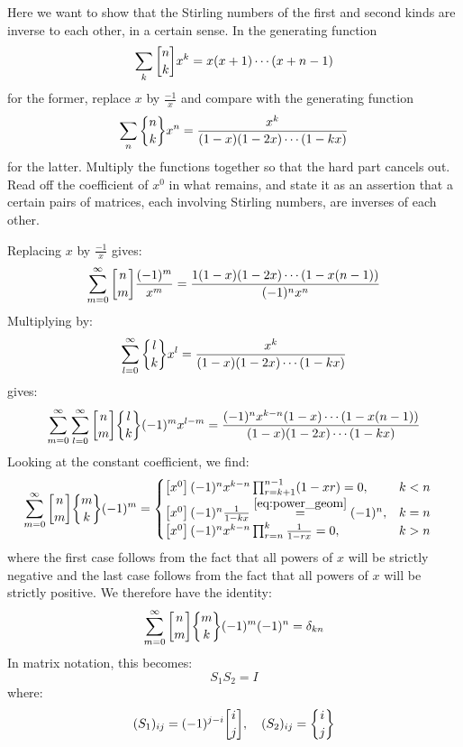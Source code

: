 \begin{exercise}
    Here we want to show that the Stirling numbers of the first and second kinds are inverse to each other, in a certain sense. In the generating function
    \[
        \sum_k \stirlingFst{n}{k}x^k = x(x+1)\cdots (x+n-1)
    \]
    for the former, replace $x$ by $\frac{-1}{x}$ and compare with the generating function 
    \[
        \sum_n \stirlingSnd{n}{k}x^n = \frac{x^k}{(1-x)(1-2x)\cdots (1-kx)}
    \]
    for the latter. Multiply the functions together so that the hard part cancels out. Read off the coefficient of $x^0$ in what remains, and state it as an assertion that a certain pairs of matrices, each involving Stirling numbers, are inverses of each other.
\end{exercise}
\begin{solution}
    Replacing $x$ by $\frac{-1}{x}$ gives:
    \[
        \bsum[m] \stirlingFst{n}{m}\frac{(-1)^m}{x^m} = \frac{1(1-x)(1-2x)\cdots (1-x(n-1))}{(-1)^nx^n}
    \]
    Multiplying by:
    \[
        \bsum[l] \stirlingSnd{l}{k}x^l = \frac{x^k}{(1-x)(1-2x)\cdots(1-kx)}
    \]
    gives:
    \[
        \bsum[m] \bsum[l] \stirlingFst{n}{m} \stirlingSnd{l}{k} (-1)^m x^{l-m} = \frac{(-1)^n x^{k-n}(1-x)\cdots(1-x(n-1))}{(1-x)(1-2x)\cdots(1-kx)}
    \]
    Looking at the constant coefficient, we find:
    \begin{align*}
        \bsum[m] \stirlingFst{n}{m}\stirlingSnd{m}{k}(-1)^m &= \begin{cases}
            \coeff{x^0} (-1)^n x^{k-n} \prod_{r=k+1}^{n-1} (1-xr) = 0, & k < n \\
            \coeff{x^0} (-1)^n \frac{1}{1-kx} \estep{\eqref{eq:power_geom}} (-1)^n, & k = n \\
            \coeff{x^0} (-1)^n x^{k-n} \prod_{r=n}^k \frac{1}{1-rx} = 0, & k > n
        \end{cases}
    \end{align*}
    where the first case follows from the fact that all powers of $x$ will be strictly negative and the last case follows from the fact that all powers of $x$ will be strictly positive. We therefore have the identity:
    \[
        \bsum[m] \stirlingFst{n}{m}\stirlingSnd{m}{k}(-1)^{m}(-1)^n = \delta_{kn}
    \]
    In matrix notation, this becomes:
    \[
        S_1 S_2 = I
    \]
    where:
    \[
        (S_1)_{ij} = (-1)^{j-i}\displaystyle\stirlingFst{i}{j}, \quad (S_2)_{ij} = \displaystyle\stirlingSnd{i}{j}
    \]
\end{solution}

